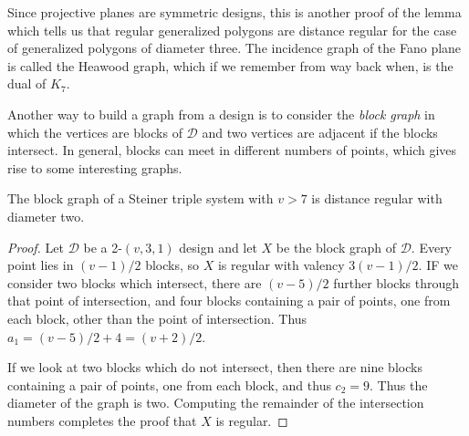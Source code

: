 Since projective planes are symmetric designs, this is another proof of the lemma which tells us that regular generalized polygons are distance regular for the case of generalized polygons of diameter three.  The incidence graph of the Fano plane is called the Heawood graph, which if we remember from way back when, is the dual of $K_7$.

Another way to build a graph from a design is to consider the \textit{block graph} in which the vertices are blocks of $\mathcal{D}$ and two vertices are adjacent if the blocks intersect.  In general, blocks can meet in different numbers of points, which gives rise to some interesting graphs.
\begin{theorem}
	The block graph of a Steiner triple system with $v>7$ is distance regular with diameter two.
\end{theorem}
\begin{proof}
	Let $\mathcal{D}$ be a 2-$(v,3,1)$ design and let $X$ be the block graph of $\mathcal{D}$.  Every point lies in $(v-1)/2$ blocks, so $X$ is regular with valency $3(v-1)/2$.  IF we consider two blocks which intersect, there are $(v-5)/2$ further blocks through that point of intersection, and four blocks containing a pair of points, one from each block, other than the point of intersection.  Thus $a_1=(v-5)/2+4=(v+2)/2$.
	
	If we look at two blocks which do not intersect, then there are nine blocks containing a pair of points, one from each block, and thus $c_2=9$.  Thus the diameter of the graph is two.  Computing the remainder of the intersection numbers completes the proof that $X$ is regular.
\end{proof}
















\ifdraft


\fi 